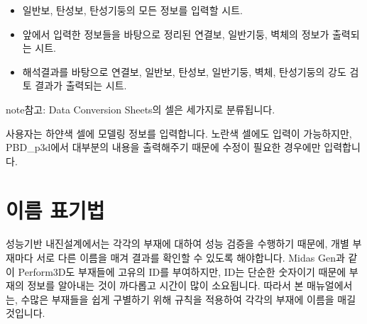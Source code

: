 \documentclass[a4paper,11pt,korean,openany,oneside]{sphinxmanual}
\begin{document}
\begin{itemize}
\begin{description}
\end{description}

\item {} \begin{description}
\sphinxAtStartPar
일반보, 탄성보, 탄성기둥의 모든 정보를 입력할 시트.

\end{description}

\item {} \begin{description}
\sphinxAtStartPar
앞에서 입력한 정보들을 바탕으로 정리된 연결보, 일반기둥, 벽체의 정보가 출력되는 시트.

\end{description}

\item {} \begin{description}
\sphinxAtStartPar
해석결과를 바탕으로 연결보, 일반보, 탄성보, 일반기둥, 벽체, 탄성기둥의 강도 검토 결과가 출력되는 시트.

\end{description}

\end{itemize}

\newpage

\begin{sphinxadmonition}{note}{참고:}
\sphinxAtStartPar
Data Conversion Sheets의 셀은 세가지로 분류됩니다.


\sphinxAtStartPar
사용자는 하얀색 셀에 모델링 정보를 입력합니다.
노란색 셀에도 입력이 가능하지만, PBD\_p3d에서 대부분의 내용을 출력해주기 때문에 수정이 필요한 경우에만 입력합니다.
\end{sphinxadmonition}

\sphinxstepscope


\section{이름 표기법}
\label{\detokenize{2_naming_rules:id1}}\label{\detokenize{2_naming_rules::doc}}
\sphinxAtStartPar
성능기반 내진설계에서는 각각의 부재에 대하여 성능 검증을 수행하기 때문에, 개별 부재마다 서로 다른 이름을 매겨 결과를 확인할 수 있도록 해야합니다.
Midas Gen과 같이 Perform\sphinxhyphen{}3D도 부재들에 고유의 ID를 부여하지만, ID는 단순한 숫자이기 때문에 부재의 정보를 알아내는 것이 까다롭고 시간이 많이 소요됩니다.
따라서 본 매뉴얼에서는, 수많은 부재들을 쉽게 구별하기 위해 규칙을 적용하여 각각의 부재에 이름을 매길 것입니다.
\end{document}
